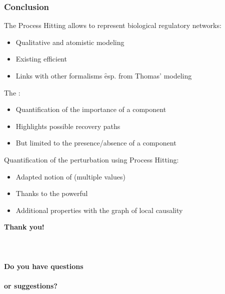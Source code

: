
\begin{frame}[c]
  \frametitle{Conclusion}

The Process Hitting allows to represent biological regulatory networks:
\begin{itemize}
  \item Qualitative and atomistic modeling
  \item Existing efficient 
  \item Links with other formalisms \f esp. from Thomas' modeling
\end{itemize}

\pause
\bigskip
The :
\begin{itemize}
  \item Quantification of the importance of a component
  \item Highlights possible recovery paths
  \item But limited to the presence/absence of a component
\end{itemize}

\pause
\bigskip
Quantification of the perturbation using Process Hitting:
\begin{itemize}
  \item Adapted notion of  (multiple values)
  \item Thanks to the powerful 
  \item Additional properties with the graph of local causality
\end{itemize}
\end{frame}



\begin{frame}[c]
\vspace*{2cm}
\centering
\Large
\bfseries
\textcolor{couleurtheme}{
Thank you!\qquad~\\~\\~\\~\\
Do you have questions\qquad~\\~\\
or suggestions?\qquad~\\
}
\end{frame}
